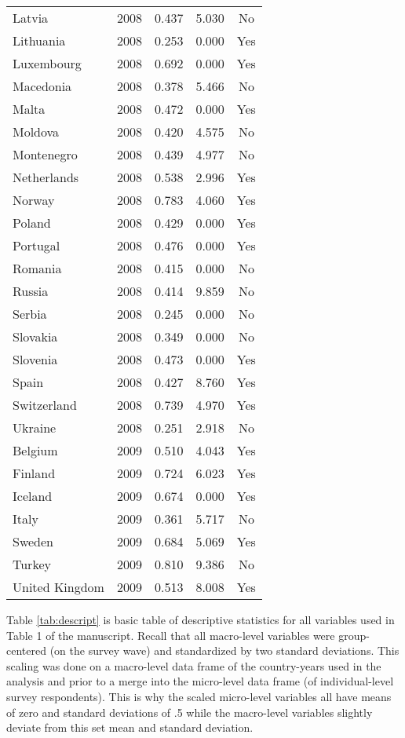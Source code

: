 \documentclass[11pt,]{article}
\begin{document}
\begin{longtable}{lc|ccc}
  Latvia & 2008 & 0.437 & 5.030 & No \\ 
  Lithuania & 2008 & 0.253 & 0.000 & Yes \\ 
  Luxembourg & 2008 & 0.692 & 0.000 & Yes \\ 
  Macedonia & 2008 & 0.378 & 5.466 & No \\ 
  Malta & 2008 & 0.472 & 0.000 & Yes \\ 
  Moldova & 2008 & 0.420 & 4.575 & No \\ 
  Montenegro & 2008 & 0.439 & 4.977 & No \\ 
  Netherlands & 2008 & 0.538 & 2.996 & Yes \\ 
  Norway & 2008 & 0.783 & 4.060 & Yes \\ 
  Poland & 2008 & 0.429 & 0.000 & Yes \\ 
  Portugal & 2008 & 0.476 & 0.000 & Yes \\ 
  Romania & 2008 & 0.415 & 0.000 & No \\ 
  Russia & 2008 & 0.414 & 9.859 & No \\ 
  Serbia & 2008 & 0.245 & 0.000 & No \\ 
  Slovakia & 2008 & 0.349 & 0.000 & No \\ 
  Slovenia & 2008 & 0.473 & 0.000 & Yes \\ 
  Spain & 2008 & 0.427 & 8.760 & Yes \\ 
  Switzerland & 2008 & 0.739 & 4.970 & Yes \\ 
  Ukraine & 2008 & 0.251 & 2.918 & No \\ 
  Belgium & 2009 & 0.510 & 4.043 & Yes \\ 
  Finland & 2009 & 0.724 & 6.023 & Yes \\ 
  Iceland & 2009 & 0.674 & 0.000 & Yes \\ 
  Italy & 2009 & 0.361 & 5.717 & No \\ 
  Sweden & 2009 & 0.684 & 5.069 & Yes \\ 
  Turkey & 2009 & 0.810 & 9.386 & No \\ 
  United Kingdom & 2009 & 0.513 & 8.008 & Yes \\ 
  \hline
\end{longtable}

Table \ref{tab:descript} is basic table of descriptive statistics for
all variables used in Table 1 of the manuscript. Recall that all
macro-level variables were group-centered (on the survey wave) and
standardized by two standard deviations. This scaling was done on a
macro-level data frame of the country-years used in the analysis and
prior to a merge into the micro-level data frame (of individual-level
survey respondents). This is why the scaled micro-level variables all
have means of zero and standard deviations of .5 while the macro-level
variables slightly deviate from this set mean and standard deviation.
\end{document}
